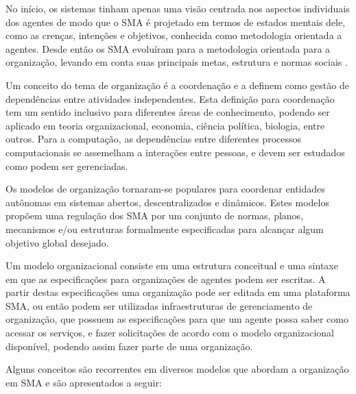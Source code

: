 No início, os sistemas tinham apenas uma visão centrada nos aspectos individuais dos agentes de modo que o SMA é projetado em termos de estados mentais dele, como as crenças, intenções e objetivos, conhecida como metodologia orientada a agentes. Desde então os SMA evoluíram para a metodologia orientada para a organização, levando em conta suas principais metas, estrutura e normas sociais \cite{argente2006multi}. 

Um conceito do tema de organização é a coordenação e \citet{malone1994interdisciplinary} a definem como gestão de dependências entre atividades independentes. Esta definição para coordenação tem um sentido inclusivo para diferentes áreas de conhecimento, podendo ser aplicado em teoria organizacional, economia, ciência política, biologia, entre outros. Para a computação, as dependências entre diferentes processos computacionais se assemelham a interações entre pessoas, e devem ser estudados como podem ser gerenciadas.

Os modelos de organização tornaram-se populares para coordenar entidades autônomas em sistemas abertos, descentralizados e dinâmicos. Estes modelos propõem uma regulação dos SMA por um conjunto de normas, planos, mecanismos e/ou estruturas formalmente especificadas para alcançar algum objetivo global desejado.

Um modelo organizacional consiste em uma estrutura conceitual e uma sintaxe em que as especificações para organizações de agentes podem ser escritas. A partir destas especificações uma organização pode ser editada em uma plataforma SMA, ou então podem ser utilizadas infraestruturas de gerenciamento de organização, que possuem as especificações para que um agente possa saber como acessar os serviços, e fazer solicitações de acordo com o modelo organizacional disponível, podendo assim fazer parte de uma organização.

Alguns conceitos são recorrentes em diversos modelos que abordam a organização em SMA e são apresentados a seguir:

